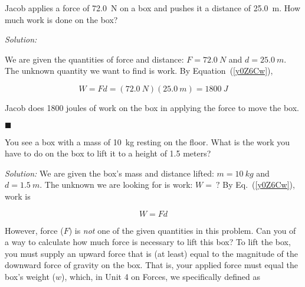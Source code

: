\documentclass[dvipsnames]{article}
\begin{document}
\begin{example} \label{HKavsZ}
Jacob applies a force of \SI{72.0}{N} on a box and pushes it a distance of \SI{25.0}{m}. How much work is done on the box?
\end{example} 

\begin{center}
\end{center}

\textit{Solution:} 

We are given the quantities of force and distance: $F = \SI{72.0}{N}$ and $d = \SI{25.0}{m}$. The unknown quantity we want to find is work. By Equation~(\ref{y0Z6Cw}), 

\begin{equation*}
    W = F d = \left(\SI{72.0}{N}\right)\left(\SI{25.0}{m}\right) = \SI{1800}{J}
\end{equation*}

Jacob does 1800 joules of work on the box in applying the force to move the box.

\hfill $\blacksquare$


\begin{example}\label{O9RxyJ}
You see a box with a mass of \SI{10}{kg} resting on the floor. What is the work you have to do on the box to lift it to a height of 1.5 meters? 
\end{example} 
 

\textit{Solution:} 
We are given the box's mass and distance lifted: $m = \SI{10}{kg}$ and $d = \SI{1.5}{m}$. The unknown we are looking for is work: $W =\ ?$ By Eq.~(\ref{y0Z6Cw}), work is

\begin{equation*}
    W = F d
\end{equation*}

However, force ($F$) is \textit{not} one of the given quantities in this problem. Can you of a way to calculate how much force is necessary to lift this box? To lift the box, you must supply an upward force that is (at least) equal to the magnitude of the downward force of gravity on the box. That is, your applied force must equal the box's weight ($w$), which, in Unit 4 on Forces, we specifically defined as
\end{document}
